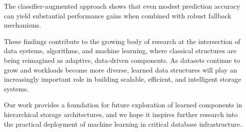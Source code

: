 \documentclass{mnitjaipur}
\begin{document}
The classifier-augmented approach shows that even modest prediction accuracy can yield substantial performance gains when combined with robust fallback mechanisms.

These findings contribute to the growing body of research at the intersection of data systems, algorithms, and machine learning, where classical structures are being reimagined as adaptive, data-driven components. As datasets continue to grow and workloads become more diverse, learned data structures will play an increasingly important role in building scalable, efficient, and intelligent storage systems.

Our work provides a foundation for future exploration of learned components in hierarchical storage architectures, and we hope it inspires further research into the practical deployment of machine learning in critical database infrastructure.

\newpage
\end{document}
